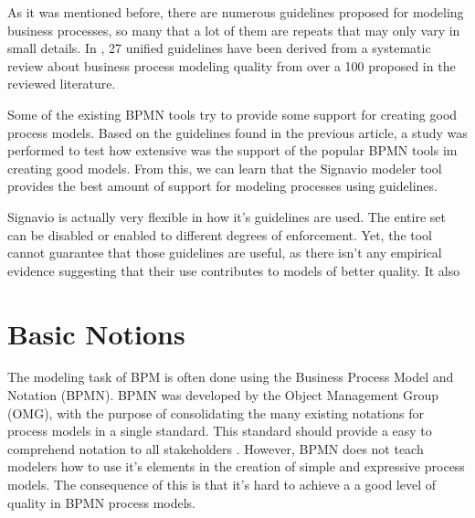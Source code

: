 \documentclass{llncs}
\begin{document}
As it was mentioned before, there are numerous guidelines proposed for modeling business processes, so many that a lot of them are repeats that may only vary in small details. In \cite{Moreno-MontesdeOca2014}, 27 unified guidelines have been derived from a systematic review about business process modeling quality from over a 100 proposed in the reviewed literature. 

Some of the existing BPMN tools try to provide some support for creating good process models. Based on the guidelines found in the previous article, a study \cite{MoniqueSnoeckIsel2015} was performed to test how extensive was the support of the popular BPMN tools im creating good models. From this, we can learn that the Signavio modeler tool provides the best amount of support for modeling processes using guidelines. 

Signavio is actually very flexible in how it's guidelines are used. The entire set can be disabled or enabled to different degrees of enforcement. Yet, the tool cannot guarantee that those guidelines are useful, as there isn't any empirical evidence suggesting that their use contributes to models of better quality. It also 

\section{Basic Notions}\label{Fundamentals}\label{Background}

The modeling task of BPM is often done using the Business Process Model and Notation (BPMN). BPMN was developed by the Object Management Group (OMG), with the purpose of consolidating the many existing notations for process models in a single standard. This standard should provide a easy to comprehend notation to all stakeholders \cite{OMGObjectManagementGroup2015}. However, BPMN does not teach modelers how to use it's elements in the creation of simple and expressive process models. %
The consequence of this is that it's hard to achieve a a good level of quality in BPMN process models.


\end{document}
